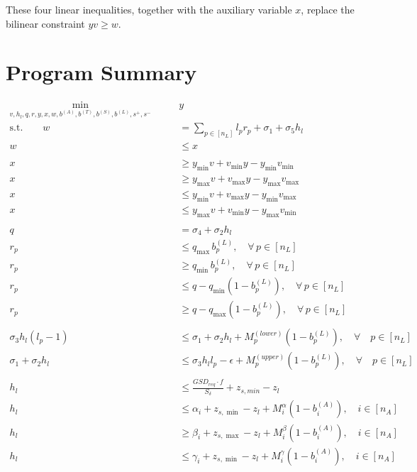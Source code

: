 \documentclass[11pt]{article}
\begin{document}
These four linear inequalities, together with the auxiliary variable $x$, replace the bilinear constraint \(y v \ge w\).


\section{Program Summary}

\begin{align*}
  \min_{v,h_l,q,r,y,x,w,b^{(A)},b^{(T)},b^{(S)},b^{(L)},s^+,s^-} \quad \quad & y\\
  \text{s.t.} \quad \quad w &= \sum_{p \in [n_L]}l_pr_p+\sigma_1 + \sigma_5h_l\\
  w &\leq x\\
  \\
  x &\ge y_{\min} v + v_{\min} y - y_{\min} v_{\min} \\
  x &\ge y_{\max} v + v_{\max} y - y_{\max} v_{\max} \\
  x &\le y_{\min} v + v_{\max} y - y_{\min} v_{\max} \\
  x &\le y_{\max} v + v_{\min} y - y_{\max} v_{\min} \\
  \\
  q &= \sigma_4 + \sigma_2h_l\\
  r_{p} &\leq q_{\max}\,b_{p}^{(L)}, \quad \forall\,p\in [n_L] \\
  r_{p} &\geq q_{\min}\,b_{p}^{(L)}, \quad \forall\,p\in [n_L] \\
  r_{p} &\leq q - q_{\min}(1 - b_{p}^{(L)}), \quad \forall\,p\in [n_L] \\
  r_{p} &\geq q - q_{\max}(1 - b_{p}^{(L)}), \quad \forall\,p\in [n_L]\\
  \\
  \sigma_3h_l(l_p-1) &\leq \sigma_1 + \sigma_2h_l +M_p^{(lower)}(1-b_p^{(L)}), \quad \forall \quad p \in [n_L]\\
  \sigma_1 + \sigma_2h_l &\leq \sigma_3h_ll_p - \epsilon + M_p^{(upper)}(1-b_p^{(L)}), \quad \forall \quad p \in [n_L]\\
  \\
  h_l &\leq \frac{GSD_{req} \cdot f }{S_\delta} + z_{s,min} - z_l\\
  h_l &\leq \alpha_i +z_{s,\min} - z_l + M_i^\alpha(1-b_i^{(A)}), \quad i \in [n_A]\\
  h_l &\geq \beta_i + z_{s,\max} - z_l + M^{\beta}_i(1-b_i^{(A)}), \quad i \in [n_A]\\
  h_l &\leq \gamma_i + z_{s,\min} - z_l + M^\gamma_i(1-b_i^{(A)}), \quad i \in [n_A]\\

\end{align*}
\end{document}
